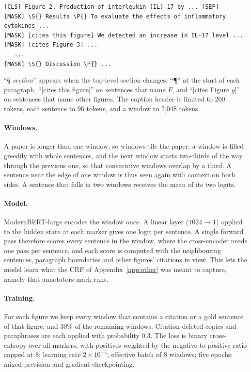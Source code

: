 \begin{Verbatim}[fontsize=\footnotesize,frame=single,framesep=6pt,rulecolor=\color{navy!30},commandchars=\\\{\}]
[CLS] Figure 2. Production of interleukin (IL)-17 by ... [SEP]
[MASK] \S{} Results \P{} To evaluate the effects of inflammatory cytokines ...
[MASK] [cites this figure] We detected an increase in IL-17 level ...
[MASK] [cites Figure 3] ...
   ...
[MASK] \S{} Discussion \P{} ...
\end{Verbatim}

``\S{} \emph{section}'' appears when the top-level section changes, ``\P'' at the start of each paragraph,
``[cites this figure]'' on sentences that name $F$, and ``[cites Figure $g$]'' on sentences that name other
figures. The caption header is limited to 200 tokens, each sentence to 96 tokens, and a window to 2{,}048
tokens.

\paragraph{Windows.} A paper is longer than one window, so windows tile the paper: a window is filled greedily
with whole sentences, and the next window starts two-thirds of the way through the previous one, so that
consecutive windows overlap by a third. A sentence near the edge of one window is thus seen again with context
on both sides. A sentence that falls in two windows receives the mean of its two logits.

\paragraph{Model.} ModernBERT-large encodes the window once. A linear layer ($1024\rightarrow1$) applied to the
hidden state at each marker gives one logit per sentence. A single forward pass therefore scores every sentence
in the window, where the cross-encoder needs one pass per sentence, and each score is computed with the
neighbouring sentences, paragraph boundaries and other figures' citations in view. This lets the model learn
what the CRF of Appendix~\ref{app:other} was meant to capture, namely that annotators mark runs.

\paragraph{Training.} For each figure we keep every window that contains a citation or a gold sentence of that
figure, and 30\% of the remaining windows. Citation-deleted copies and paraphrases are each applied with
probability 0.3. The loss is binary cross-entropy over all markers, with positives weighted by the
negative-to-positive ratio capped at 8; learning rate $2\times10^{-5}$; effective batch of 8 windows; five
epochs; mixed precision and gradient checkpointing.


